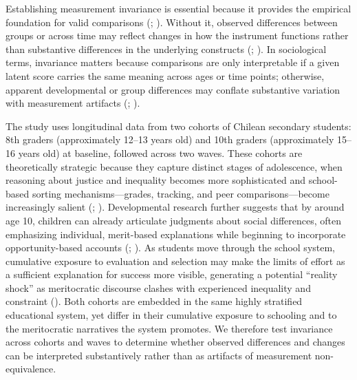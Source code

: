 \documentclass[
  13pt,
]{article}
\begin{document}
Establishing measurement invariance is essential because it provides the
empirical foundation for valid comparisons
(;
).
Without it, observed differences between groups or across time may
reflect changes in how the instrument functions rather than substantive
differences in the underlying constructs
(;
).
In sociological terms, invariance matters because comparisons are only
interpretable if a given latent score carries the same meaning across
ages or time points; otherwise, apparent developmental or group
differences may conflate substantive variation with measurement
artifacts (;
).

The study uses longitudinal data from two cohorts of Chilean secondary
students: 8th graders (approximately 12--13 years old) and 10th graders
(approximately 15--16 years old) at baseline, followed across two waves.
These cohorts are theoretically strategic because they capture distinct
stages of adolescence, when reasoning about justice and inequality
becomes more sophisticated and school-based sorting mechanisms---grades,
tracking, and peer comparisons---become increasingly salient
(;
). Developmental
research further suggests that by around age 10, children can already
articulate judgments about social differences, often emphasizing
individual, merit-based explanations while beginning to incorporate
opportunity-based accounts (; ).
As students move through the school system, cumulative exposure to
evaluation and selection may make the limits of effort as a sufficient
explanation for success more visible, generating a potential ``reality
shock'' as meritocratic discourse clashes with experienced inequality
and constraint (). Both cohorts are embedded in the same highly stratified
educational system, yet differ in their cumulative exposure to schooling
and to the meritocratic narratives the system promotes. We therefore
test invariance across cohorts and waves to determine whether observed
differences and changes can be interpreted substantively rather than as
artifacts of measurement non-equivalence.
\end{document}
